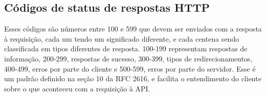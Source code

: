 \subsection{Códigos de status de respostas HTTP}
Esses códigos são números entre 100 e 599 que devem ser enviados com a resposta à requisição, cada um tendo um significado diferente, e cada centena sendo classificada em tipos diferentes de resposta. 100-199 representam respostas de informação, 200-299, respostas de sucesso, 300-399, tipos de redirecionamentos, 400-499, erros por parte do cliente e 500-599, erros por parte do servidor. Esse é um padrão definido na seção 10 da RFC 2616, e facilita o entendimento do cliente sobre o que aconteceu com a requisição à API. \cite{rfc_http_nielsen_1999, api-design-restfulapi}







